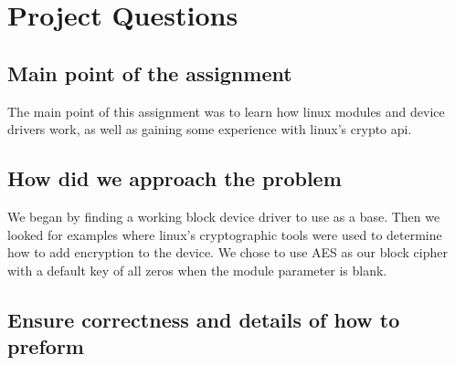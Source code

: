 \documentclass[letterpaper,10pt,titlepage]{article}
\begin{document}
\section{Project Questions}

\subsection{Main point of the assignment}
The main point of this assignment was to learn how linux modules and device drivers work, 
as well as gaining some experience with linux's crypto api. 
\subsection{How did we approach the problem}
We began by finding a working block device driver to use as a base. Then we looked for examples 
where linux's cryptographic tools were used to determine how to add encryption to the device. We chose
 to use AES as our block cipher with a default key of all zeros when the module parameter is blank.
\subsection{Ensure correctness and details of how to preform}
\end{document}
